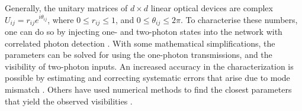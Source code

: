 \documentclass[times,final]{elsarticle}
\begin{document}
{Generally, the unitary matrices of $d\times d$ linear optical devices are complex $U_{ij}=r_{ij}e^{i\theta_{ij}}$, where $0 \leq r_{ij}\leq 1$, and $0\leq \theta_{ij}\leq 2\pi$. To characterise these numbers, one can do so by injecting one- and two-photon states into the network with correlated photon detection \cite{bib:Laing12}. With some mathematical simplifications, the parameters can be solved for using the one-photon transmissions, and the visibility of two-photon inputs.
%
%
An increased accuracy in the characterization is possible by estimating 
and correcting systematic errors that arise due to mode mismatch 
\cite{Dhand16}. Others have used numerical methods to find the closest 
parameters that yield the observed visibilities 
\cite{bib:Spagnolo16,bib:Tillmann16}.

}
\end{document}
